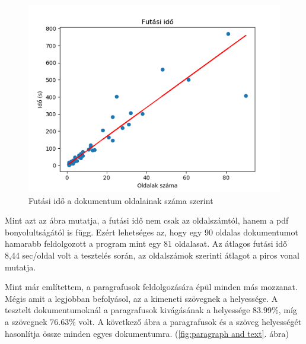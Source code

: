 \begin{figure}[H]
\centering
\includegraphics[scale=1]{images/runtime.png}
\caption{Futási idő a dokumentum oldalainak száma szerint}
\label{fig:runtime}
\end{figure}

Mint azt az ábra mutatja, a futási idő nem csak az oldalszámtól, hanem a pdf bonyolultságától is függ. Ezért lehetséges az, hogy egy 90 oldalas dokumentumot hamarabb feldolgozott a program mint egy 81 oldalasat. Az átlagos futási idő 8,44 sec/oldal volt a tesztelés során, az oldalszámok szerinti átlagot a piros vonal mutatja.


Mint már említettem, a paragrafusok feldolgozására épül minden más mozzanat. Mégis amit a legjobban befolyásol, az a kimeneti szövegnek a helyessége. A tesztelt dokumentumoknál a paragrafusok kivágásának a helyessége 83.99\%, míg a szövegnek 76.63\% volt. A következő ábra a paragrafusok és a szöveg helyességét hasonlítja össze minden egyes dokumentumra. (\ref{fig:paragraph and text}. ábra)

